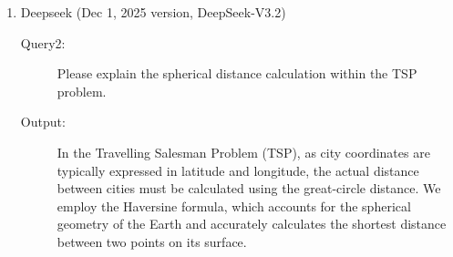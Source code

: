 \documentclass{mcmthesis} %
\begin{document}
\begin{enumerate}
\begin{description}
Image Segmentation: Clustering pixels within images into distinct regions\\
\end{description}
\item Deepseek (Dec 1, 2025 version, DeepSeek-V3.2) 
\begin{description}
\item[Query2:] Please explain the spherical distance calculation within the TSP problem.
\item[Output:] In the Travelling Salesman Problem (TSP), as city coordinates are typically expressed in latitude and longitude, the actual distance between cities must be calculated using the great-circle distance. We employ the Haversine formula, which accounts for the spherical geometry of the Earth and accurately calculates the shortest distance between two points on its surface.
\end{description}
\end{enumerate}

\clearpage
\setcounter{page}{\value{lastpage}}
\end{document}
